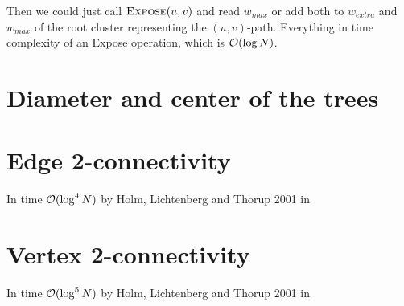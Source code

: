 Then we could just call $\hbox{\sc Expose}(u,v)$ and read $w_{max}$ or add both to
$w_{extra}$ and $w_{max}$ of the root cluster representing the $(u,v)$-path.
Everything in time complexity of an {\sc Expose} operation, which is ${\cal O}(\log
N)$.


\section{Diameter and center of the trees}


\section{Edge 2-connectivity}
\label{sec:edge_2_connectivity}

In time ${\cal O}(\log^4 N)$ by Holm, Lichtenberg and Thorup 2001 in \cite{PolylogarithmicAlgorithmsForConnectivity}



\section{Vertex 2-connectivity}

In time ${\cal O}(\log^5 N)$ by Holm, Lichtenberg and Thorup 2001 in \cite{PolylogarithmicAlgorithmsForConnectivity}

